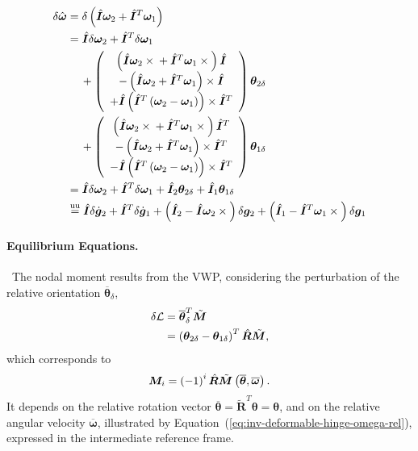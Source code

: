 \documentclass[10pt,fleqn,subeqn]{report}
\newcommand{\T}[1]{\bm{#1}}
\newcommand{\equu}{\overset{\text{uu}}{=}}
\begin{document}
\begin{align}
	\delta\hat{\T{\omega}} &= 
	\delta\plbr{
		\hat{\T{I}} \T{\omega}_2
		+ \hat{\T{I}}^T \T{\omega}_1
	} \nonumber \\
	&= \hat{\T{I}} \delta\T{\omega}_2
		+ \hat{\T{I}}^T \delta\T{\omega}_1
	\nonumber \\
	&\mbox{\hspace{12pt}}
	+ \plbr{\cvvect{
		\plbr{
			\hat{\T{I}} \T{\omega}_2 \times{}
			+ \hat{\T{I}}^T \T{\omega}_1 \times{}
		} \hat{\T{I}} \\
		- \plbr{
			\hat{\T{I}} \T{\omega}_2 + \hat{\T{I}}^T \T{\omega}_1
		} \times \hat{\T{I}} \\
		+ \hat{\T{I}} \plbr{
			\hat{\T{I}}^T \plbr{
				\T{\omega}_2 - \T{\omega}_1
			}
		}\times \hat{\T{I}}^T
	}} \T{\theta}_{2\delta} \nonumber \\
	&\mbox{\hspace{12pt}}
	+ \plbr{\cvvect{
		\plbr{
			\hat{\T{I}} \T{\omega}_2 \times{}
			+ \hat{\T{I}}^T \T{\omega}_1 \times{}
		} \hat{\T{I}}^T \\
		- \plbr{
			\hat{\T{I}} \T{\omega}_2 + \hat{\T{I}}^T \T{\omega}_1
		} \times \hat{\T{I}}^T \\
		- \hat{\T{I}} \plbr{
			\hat{\T{I}}^T \plbr{
				\T{\omega}_2 - \T{\omega}_1
			}
		}\times \hat{\T{I}}^T
	}} \T{\theta}_{1\delta} \nonumber \\
	&= \hat{\T{I}} \delta\T{\omega}_2
		+ \hat{\T{I}}^T \delta\T{\omega}_1
	+ \hat{\T{I}}_2 \T{\theta}_{2\delta}
	+ \hat{\T{I}}_1 \T{\theta}_{1\delta} \nonumber \\
	&\equu
	\hat{\T{I}} \delta\dot{\T{g}}_2
		+ \hat{\T{I}}^T \delta\dot{\T{g}}_1
	+ \plbr{\hat{\T{I}}_2 - \hat{\T{I}} \T{\omega}_2\times{}}
		\delta\T{g}_2
	+ \plbr{\hat{\T{I}}_1 - \hat{\T{I}}^T \T{\omega}_1\times{}}
		\delta\T{g}_1
	\label{eq:deformable-displacement-invariant-delta-hat-omega}
\end{align}




\paragraph{Equilibrium Equations.} \
The nodal moment results from the VWP, considering the perturbation 
of the relative orientation $\overline{\T{\theta}}_{\delta}$,
\begin{align}
	\delta\mathcal{L}
	& = \overline{\T{\theta}}_{\delta}^T \tilde{\T{M}} \nonumber \\
	&= \plbr{
		\T{\theta}_{2\delta} - \T{\theta}_{1\delta}
	}^T \hat{\T{R}} \tilde{\T{M}} ,
\end{align}
which corresponds to
\begin{equation}
	\T{M}_i = \plbr{-1}^i \hat{\T{R}}
		\tilde{\T{M}}\plbr{\overline{\T{\theta}}, \overline{\T{\omega}}} .
\end{equation}
It depends on the relative rotation vector
$\overline{\T{\theta}}=\tilde{\T{R}}^T\T{\theta}=\T{\theta}$,
and on the relative angular velocity $\overline{\T{\omega}}$,
illustrated by Equation~(\ref{eq:inv-deformable-hinge-omega-rel}),
expressed in the intermediate reference frame.
\end{document}
